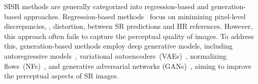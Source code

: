 SISR methods are generally categorized into regression-based and generation-based approaches.   Regression-based methods~\cite{lim2017enhanced,zhang2018residual,liang2021swinir,chen2021learning}  focus on minimizing pixel-level discrepancies, \ie, distortion, between SR predictions and HR references. However, this approach often fails to capture the perceptual quality of images. To address this, generation-based methods employ deep generative models,  including autoregressive models~\cite{oord-arxiv-2016,oord-nips-2016}, variational autoencoders~(VAEs)~\cite{Kingma2013,vahdat2021nvae}, normalizing flows~(NFs)~\cite{dinh2016density,Kingma2018}, and generative adversarial networks (GANs)~\cite{goodfellow2014generative,karras2018ProGAN,radford2015unsupervised, liang2022details},  aiming to improve the perceptual aspects of SR images.


